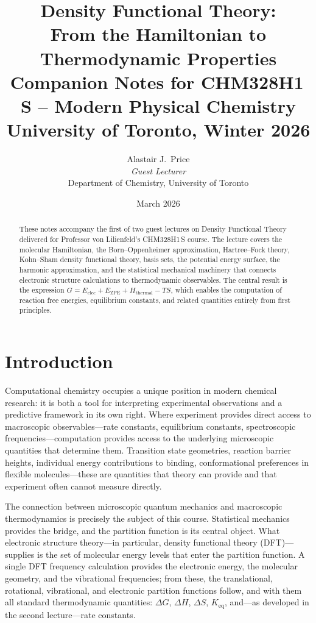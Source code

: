 \documentclass[11pt]{article}
\title{\textbf{Density Functional Theory:\\From the Hamiltonian to Thermodynamic Properties}\\[1em]
\large Companion Notes for CHM328H1\,S -- Modern Physical Chemistry\\
University of Toronto, Winter 2026}
\author{Alastair J.\ Price\\
\textit{Guest Lecturer}\\
\small Department of Chemistry, University of Toronto}
\date{March 2026}
\numberwithin{equation}{section}
\begin{document}
\maketitle
\thispagestyle{fancy}

\begin{abstract}
\noindent
These notes accompany the first of two guest lectures on Density Functional Theory delivered for Professor von Lilienfeld's CHM328H1\,S course. The lecture covers the molecular Hamiltonian, the Born--Oppenheimer approximation, Hartree--Fock theory, Kohn--Sham density functional theory, basis sets, the potential energy surface, the harmonic approximation, and the statistical mechanical machinery that connects electronic structure calculations to thermodynamic observables. The central result is the expression $G = E_\text{elec} + E_\text{ZPE} + H_\text{thermal} - TS$, which enables the computation of reaction free energies, equilibrium constants, and related quantities entirely from first principles.
\end{abstract}

\tableofcontents
\newpage

\section{Introduction}
\label{sec:intro}

Computational chemistry occupies a unique position in modern chemical research: it is both a tool for interpreting experimental observations and a predictive framework in its own right. Where experiment provides direct access to macroscopic observables---rate constants, equilibrium constants, spectroscopic frequencies---computation provides access to the underlying microscopic quantities that determine them. Transition state geometries, reaction barrier heights, individual energy contributions to binding, conformational preferences in flexible molecules---these are quantities that theory can provide and that experiment often cannot measure directly.

The connection between microscopic quantum mechanics and macroscopic thermodynamics is precisely the subject of this course. Statistical mechanics provides the bridge, and the partition function is its central object. What electronic structure theory---in particular, density functional theory (DFT)---supplies is the set of molecular energy levels that enter the partition function. A single DFT frequency calculation provides the electronic energy, the molecular geometry, and the vibrational frequencies; from these, the translational, rotational, vibrational, and electronic partition functions follow, and with them all standard thermodynamic quantities: $\Delta G$, $\Delta H$, $\Delta S$, $K_\text{eq}$, and---as developed in the second lecture---rate constants.
\end{document}
